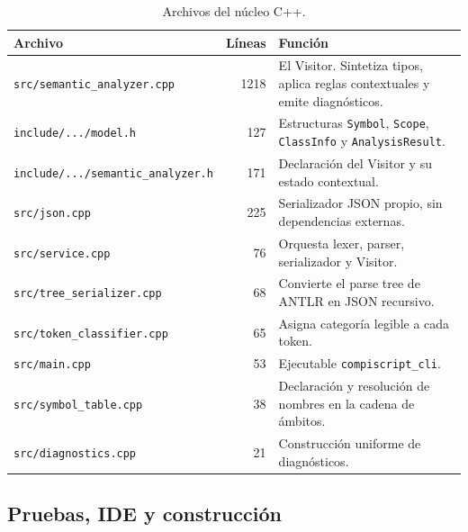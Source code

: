 \documentclass[11pt,a4paper]{article}
\begin{document}
\begin{table}[H]
\centering
\small
\begin{tabular}{@{}L{6.3cm}rL{6.3cm}@{}}
\toprule
\textbf{Archivo} & \textbf{Líneas} & \textbf{Función} \\
\midrule
\texttt{src/semantic\_analyzer.cpp} & 1218 &
El Visitor. Sintetiza tipos, aplica reglas contextuales y emite diagnósticos. \\
\texttt{include/.../model.h} & 127 &
Estructuras \texttt{Symbol}, \texttt{Scope}, \texttt{ClassInfo} y
\texttt{AnalysisResult}. \\
\texttt{include/.../semantic\_analyzer.h} & 171 &
Declaración del Visitor y su estado contextual. \\
\texttt{src/json.cpp} & 225 &
Serializador JSON propio, sin dependencias externas. \\
\texttt{src/service.cpp} & 76 &
Orquesta lexer, parser, serializador y Visitor. \\
\texttt{src/tree\_serializer.cpp} & 68 &
Convierte el parse tree de ANTLR en JSON recursivo. \\
\texttt{src/token\_classifier.cpp} & 65 &
Asigna categoría legible a cada token. \\
\texttt{src/main.cpp} & 53 &
Ejecutable \texttt{compiscript\_cli}. \\
\texttt{src/symbol\_table.cpp} & 38 &
Declaración y resolución de nombres en la cadena de ámbitos. \\
\texttt{src/diagnostics.cpp} & 21 &
Construcción uniforme de diagnósticos. \\
\bottomrule
\end{tabular}
\caption{Archivos del núcleo C++.}
\end{table}

\subsection{Pruebas, IDE y construcción}
\end{document}
